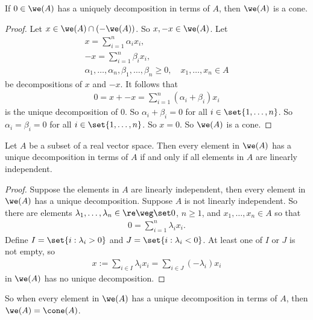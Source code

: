 \documentclass[12pt,a4paper]{article}
\begin{document}
\begin{lemma}
    If $0\in\we(A)$ has a uniquely decomposition in terms of $A$, then $\we(A)$ is a cone. 
\end{lemma}
\begin{proof}
    Let $x\in \we(A)\cap(-\we(A))$. So $x,-x \in \we(A)$. Let 
    \begin{align*}
        x = \sum_{i=1}^n \alpha_ix_i,\\
        -x = \sum_{i=1}^n \beta_ix_i,\\
        \alpha_1,\ldots,\alpha_n,\beta_1,\ldots,\beta_n\ge 0, \quad x_1,\ldots,x_n\in A
    \end{align*}
    be decompositions of $x$ and $-x$. 
    It follows that 
    \begin{align*}
        0 = x+-x = \sum_{i=1}^n (\alpha_i+\beta_i)x_i 
    \end{align*}
    is the unique decomposition of 0. So $\alpha_i+\beta_i=0$ for all $i\in\set{1,\ldots,n}$. So $\alpha_i=\beta_i=0$ for all $i\in\set{1,\ldots,n}$. So $x=0$. So $\we(A)$ is a cone. 
\end{proof}



\begin{lemma}\label{lem:coneuniquedecompositionifandonlyifelementsarelinearlyindependent}
 Let $A$ be a subset of a real vector space. Then every element in $\we(A)$ has a unique decomposition in terms of $A$ if and only if all elements in $A$ are linearly independent. 
\end{lemma}
\begin{proof}
    Suppose the elements in $A$ are linearly independent, then every element in $\we(A)$ has a unique decomposition. 
    Suppose $A$ is not linearly independent. So there are  elements $\lambda_1,\ldots,\lambda_n\in\re\weg\set 0$, $n\ge 1$, and $x_1,\ldots,x_n\in A$ so that 
    \begin{align*}
        0 = \sum_{i=1}^n \lambda_i x_i. 
    \end{align*}
    Define $I=\set{i:\lambda_i>0}$ and $J=\set{i:\lambda_i<0}$. At least one of $I$ or $J$ is not empty, so 
    \begin{align*}
        x := \sum_{i\in I} \lambda_i x_i = \sum_{i\in J}(-\lambda_i)x_i 
    \end{align*}
    in $\we(A)$ has no unique decomposition. 
\end{proof}

So when every element in $\we(A)$ has a unique decomposition in terms of $A$, then $\we(A)=\cone(A)$. 
\end{document}
